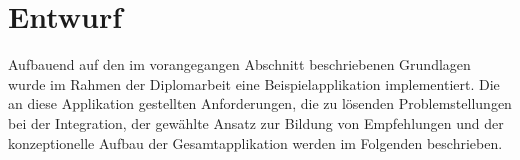 \newpage
\section{Entwurf}\label{sec:architecture}

Aufbauend auf den im vorangegangen Abschnitt beschriebenen Grundlagen wurde im Rahmen der Diplomarbeit eine Beispielapplikation implementiert. Die an diese Applikation gestellten Anforderungen, die zu lösenden Problemstellungen bei der Integration, der gewählte Ansatz zur Bildung von Empfehlungen und der konzeptionelle Aufbau der Gesamtapplikation werden im Folgenden beschrieben.






